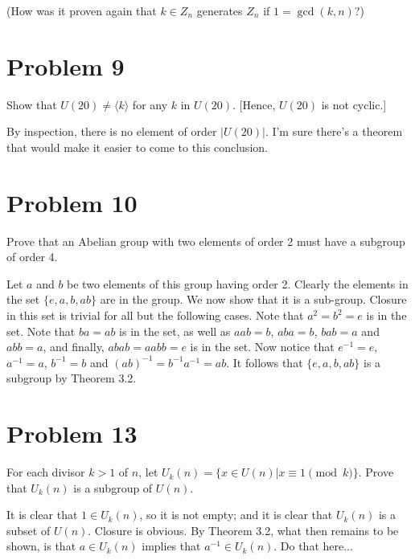 \documentclass[12pt]{article}
\begin{document}
(How was it proven again that $k\in Z_n$ generates $Z_n$ if $1=\gcd(k,n)$?)

\section*{Problem 9}

Show that $U(20)\neq\langle k\rangle$ for any $k$ in $U(20)$.  [Hence, $U(20)$ is not cyclic.]

By inspection, there is no element of order $|U(20)|$.  I'm sure there's a theorem that would
make it easier to come to this conclusion.

\section*{Problem 10}

Prove that an Abelian group with two elements of order 2 must have a subgroup of order 4.

Let $a$ and $b$ be two elements of this group having order 2.
Clearly the elements in the set $\{e,a,b,ab\}$ are in the group.
We now show that it is a sub-group.  Closure in this set is trivial for
all but the following cases.  Note that $a^2=b^2=e$ is in the set.
Note that $ba=ab$ is in the set, as well as $aab=b$, $aba=b$,
$bab=a$ and $abb=a$, and finally, $abab=aabb=e$ is in the set.
Now notice that $e^{-1}=e$, $a^{-1}=a$, $b^{-1}=b$ and $(ab)^{-1}=b^{-1}a^{-1}=ab$.
It follows that $\{e,a,b,ab\}$ is a subgroup by Theorem 3.2.

\section*{Problem 13}

For each divisor $k>1$ of $n$, let $U_k(n)=\{x\in U(n)|x\equiv 1\pmod k\}$.
Prove that $U_k(n)$ is a subgroup of $U(n)$.

It is clear that $1\in U_k(n)$, so it is not empty; and it is clear that $U_k(n)$ is a subset of $U(n)$.
Closure is obvious.  By Theorem 3.2, what then remains to be shown, is that $a\in U_k(n)$
implies that $a^{-1}\in U_k(n)$.  Do that here...
\end{document}
